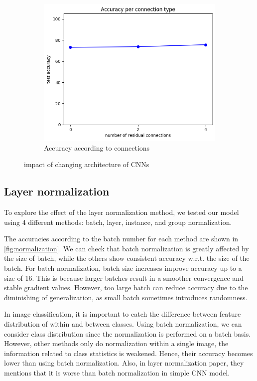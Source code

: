 \begin{figure}[htbp]
    \hfill
	\begin{subfigure}[t]{0.3\linewidth}
		\centering
		\includegraphics[width=\linewidth]{image/q4-2-connection.png}
		\caption{Accuracy according to connections}
		\label{fig:q4-2-connection}
	\end{subfigure}

	\caption{impact of changing architecture of CNNs}
	\label{fig:cnn_architecture}
\end{figure}

\subsection{Layer normalization}
To explore the effect of the layer normalization method, we tested our model using 4 different methods: batch, layer, instance, and group normalization.

The accuracies according to the batch number for each method are shown in \cref{fig:normalization}. We can check that batch normalization is greatly affected by the size of batch, while the others show consistent accuracy w.r.t. the size of the batch. For batch normalization, batch size increases improve accuracy up to a size of 16. This is because larger batches result in a smoother convergence and stable gradient values. However, too large batch can reduce accuracy due to the diminishing of generalization, as small batch sometimes introduces randomness.

In image classification, it is important to catch the difference between feature distribution of within and between classes. Using batch normalization, we can consider class distribution since the normalization is performed on a batch basis. However, other methods only do normalization within a single image, the information related to class statistics is weakened. Hence, their accuracy becomes lower than using batch normalization. Also, in layer normalization paper\cite{ba2016layernormalization}, they mentions that it is worse than batch normalization in simple CNN model.

